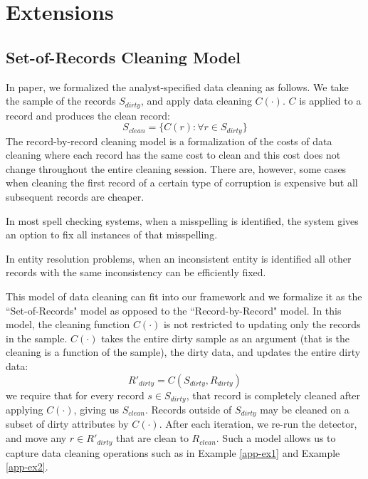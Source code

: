 \section{Extensions}
\subsection{Set-of-Records Cleaning Model}\label{set-of-r}
In paper, we formalized the analyst-specified data cleaning as follows.
We take the sample of the records $S_{dirty}$, and apply data cleaning $C(\cdot)$.
$C$ is applied to a record and produces the clean record:
\[
S_{clean} = \{C(r) : \forall r \in S_{dirty}\}
\]
The record-by-record cleaning model is a formalization of the costs of data cleaning where each record has the same cost to clean and this cost does not change throughout the entire cleaning session.
There are, however, some cases when cleaning the first record of a certain type of corruption is expensive but all subsequent records are cheaper.

\begin{example}\label{app-ex1}
In most spell checking systems, when a misspelling is identified, the system gives an option to fix all instances of that misspelling.
\end{example}

\begin{example}\label{app-ex2}
In entity resolution problems, when an inconsistent entity is identified all other records with the same inconsistency can be efficiently fixed.
\end{example}

This model of data cleaning can fit into our framework and we formalize it as the ``Set-of-Records" model as opposed to the ``Record-by-Record" model. 
In this model, the cleaning function $C(\cdot)$ is not restricted to updating only the records in the sample.
$C(\cdot)$ takes the entire dirty sample as an argument (that is the cleaning is a function of the sample), the dirty data, and updates the entire dirty data:
\[
R'_{dirty} = C(S_{dirty},R_{dirty})
\]
we require that for every record $s \in S_{dirty}$, that record is completely cleaned after applying $C(\cdot)$, giving us $S_{clean}$.
Records outside of $S_{dirty}$ may be cleaned on a subset of dirty attributes by $C(\cdot)$.
After each iteration, we re-run the detector, and move any $r \in R'_{dirty}$ that are clean to $R_{clean}$.
Such a model allows us to capture data cleaning operations such as in Example \ref{app-ex1} and Example \ref{app-ex2}.

